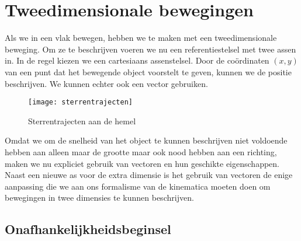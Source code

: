 \chapter{Tweedimensionale bewegingen}

Als we in een vlak bewegen, hebben we te maken met een tweedimensionale beweging. 
Om ze te beschrijven voeren we nu een referentiestelsel met twee assen in. In de regel kiezen we een cartesiaans assenstelsel.  Door de co\"ordinaten $(x,y)$ van een punt dat het bewegende object voorstelt te geven, kunnen we de positie beschrijven. We kunnen echter ook een vector gebruiken.
\begin{figure}[h]
\centering
\texttt{[image: sterrentrajecten]}
\caption{Sterrentrajecten aan de hemel}
\end{figure}
Omdat we om de snelheid van het object te kunnen beschrijven niet voldoende hebben aan alleen maar de grootte maar ook nood hebben aan een richting, maken we nu expliciet gebruik van vectoren en hun geschikte eigenschappen. Naast een nieuwe as voor de extra dimensie is het gebruik van vectoren de enige aanpassing die we aan ons formalisme van de kinematica moeten doen om bewegingen in twee dimensies te kunnen beschrijven.

\section{Onafhankelijkheidsbeginsel}

